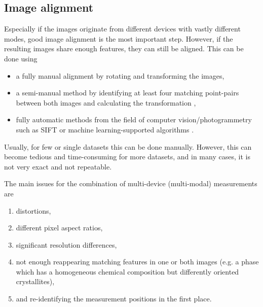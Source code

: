 \subsection{Image alignment}

Especially if the images originate from different devices with vastly different modes, good image alignment is the most important step.
However, if the resulting images share enough features, they can still be aligned.
This can be done using
\begin{itemize}
    \item a fully manual alignment by rotating and transforming the images,
    \item a semi-manual method by identifying at least four matching point-pairs between both images and calculating the transformation \cite{hartley.2003},
    \item fully automatic methods from the field of computer vision/photogrammetry such as \ac{SIFT} \cite{lowe.2004} or machine learning-supported algorithms \cite{frolov.2025}.
\end{itemize}

Usually, for few or single datasets this can be done manually.
However, this can become tedious and time-consuming for more datasets, and in many cases, it is not very exact and not repeatable.

The main issues for the combination of multi-device (multi-modal) measurements are
\begin{enumerate}
    \item distortions,
    \item different pixel aspect ratios,
    \item significant resolution differences,
    \item not enough reappearing matching features in one or both images (e.g. a phase which has a homogeneous chemical composition but differently oriented crystallites),
    \item and re-identifying the measurement positions in the first place.
\end{enumerate}



